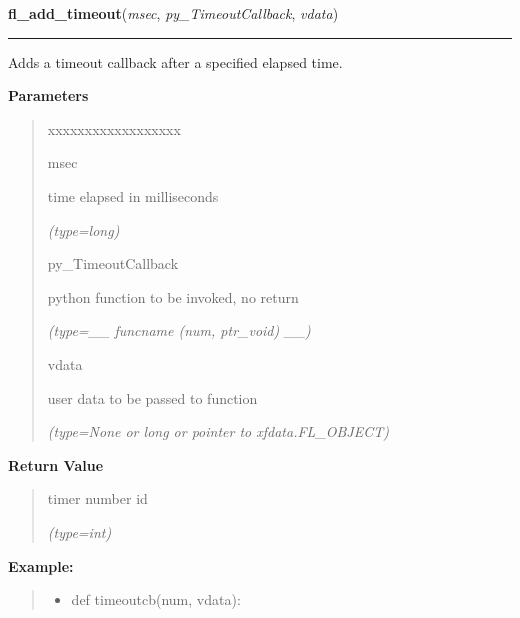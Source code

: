 \hspace{.8\funcindent}\begin{boxedminipage}{\funcwidth}

    \raggedright \textbf{fl\_add\_timeout}(\textit{msec}, \textit{py\_TimeoutCallback}, \textit{vdata})

    \vspace{-1.5ex}

    \rule{\textwidth}{0.5\fboxrule}
\setlength{\parskip}{2ex}
    Adds a timeout callback after a specified elapsed time.

\setlength{\parskip}{1ex}
      \textbf{Parameters}
      \vspace{-1ex}

      \begin{quote}
        \begin{Ventry}{xxxxxxxxxxxxxxxxxx}

          \item[msec]

          time elapsed in milliseconds

            {\it (type=long)}

          \item[py\_TimeoutCallback]

          python function to be invoked, no return

            {\it (type=\_\_ funcname (num, ptr\_void) \_\_)}

          \item[vdata]

          user data to be passed to function

            {\it (type=None or long or pointer to xfdata.FL\_OBJECT)}

        \end{Ventry}

      \end{quote}

      \textbf{Return Value}
    \vspace{-1ex}

      \begin{quote}
      timer number id

      {\it (type=int)}

      \end{quote}

\textbf{Example:}
\begin{quote}
  \begin{itemize}

  \item
    \setlength{\parskip}{0.6ex}
def timeoutcb(num, vdata):




\end{itemize}
\end{quote}
\end{boxedminipage}
